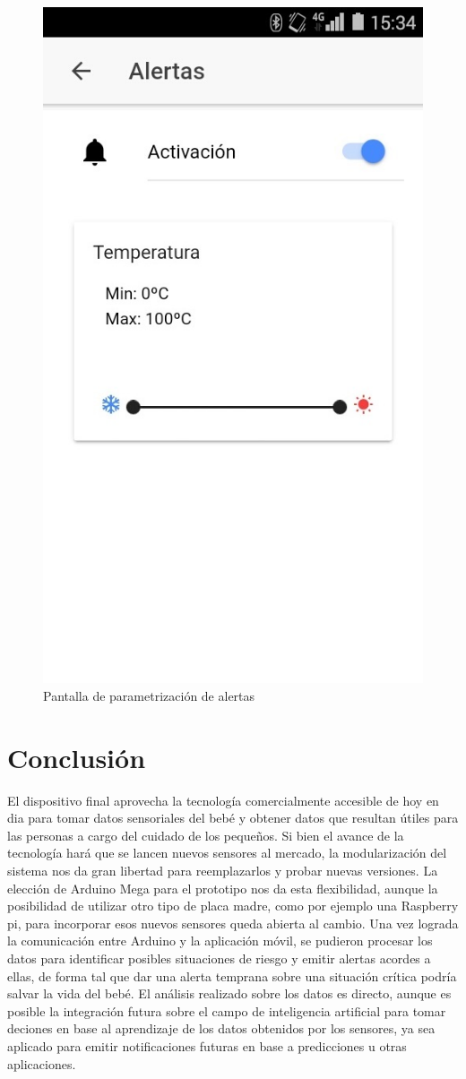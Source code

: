 \documentclass{IEEEtran}
\begin{document}
			\begin{figure}
				\centering
				\includegraphics[width=0.5\linewidth]{app-parametros}
				\caption{Pantalla de parametrización de alertas}
				\label{app-parametros}
			\end{figure}

	\section{Conclusión}

		El dispositivo final aprovecha la tecnología comercialmente accesible de hoy en dia para tomar datos sensoriales del bebé y obtener datos que resultan útiles para las personas a cargo del cuidado de los pequeños. Si bien el avance de la tecnología hará que se lancen nuevos sensores al mercado, la modularización del sistema nos da gran libertad para reemplazarlos y probar nuevas versiones. La elección de Arduino Mega para el prototipo nos da esta flexibilidad, aunque la posibilidad de utilizar otro tipo de placa madre, como por ejemplo una Raspberry pi, para incorporar esos nuevos sensores queda abierta al cambio.
		Una vez lograda la comunicación entre Arduino y la aplicación móvil, se pudieron procesar los datos para identificar posibles situaciones de riesgo y emitir alertas acordes a ellas, de forma tal que dar una alerta temprana sobre una situación crítica podría salvar la vida del bebé. El análisis realizado sobre los datos es directo, aunque es posible la integración futura sobre el campo de inteligencia artificial para tomar deciones en base al aprendizaje de los datos obtenidos por los sensores, ya sea aplicado para emitir notificaciones futuras en base a predicciones u otras aplicaciones.
\end{document}
